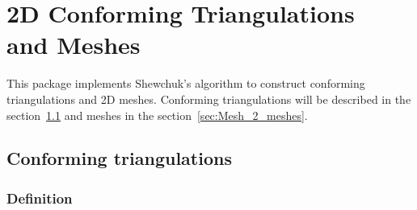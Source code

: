 \chapter{2D Conforming Triangulations\\ and Meshes}
\label{user_chapter_2D_Meshes}

\minitoc

This package implements Shewchuk's algorithm to construct conforming
triangulations and 2D meshes.
Conforming triangulations will be described in the
section~\ref{sec:Mesh_2_conforming_triangulation} and meshes in the
section~\ref{sec:Mesh_2_meshes}.






\section{Conforming triangulations}
\label{sec:Mesh_2_conforming_triangulation}

\subsection{Definition}
\label{sec:Mesh_2_conforming_defition}

